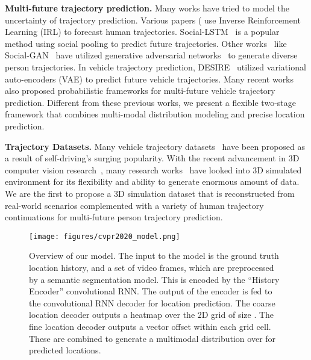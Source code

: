 \documentclass[10pt,twocolumn,letterpaper]{article}
\begin{document}
\noindent\textbf{Multi-future trajectory prediction.}
Many works have tried to model the uncertainty of trajectory prediction.
Various papers (\eg \cite{kitani2012activity,rhinehart2018r2p2,rhinehart2019precog} use Inverse Reinforcement Learning (IRL) to forecast human trajectories. 
Social-LSTM~\cite{alahi2016social} is a popular method using social pooling to predict future trajectories.
Other works~\cite{sadeghian2018sophie,gupta2018social,li2019way,amirian2019social} like Social-GAN~\cite{gupta2018social} have utilized generative adversarial networks~\cite{goodfellow2014generative} to generate diverse person trajectories.
In vehicle trajectory prediction, DESIRE~\cite{lee2017desire} utilized variational auto-encoders (VAE) to predict future vehicle trajectories.
Many recent works~\cite{thiede2019analyzing,chai2019multipath,tang2019multiple,makansi2019overcoming} also proposed probabilistic frameworks for multi-future vehicle trajectory prediction. 
Different from these previous works, we present a flexible two-stage framework that combines multi-modal distribution modeling and precise location prediction.



\noindent\textbf{Trajectory Datasets.}
Many vehicle trajectory datasets~\cite{caesar2019nuscenes,chang2019argoverse} have been proposed as a result of self-driving's surging popularity. 
With the recent advancement in 3D computer vision research~\cite{zhang2015fast,liang2017event,shah2018airsim,dosovitskiy2017carla,richter2016playing,ros2016synthia,heess2017emergence}, many research works~\cite{qiu2017unrealcv, gaidon2016virtual,de2017procedural,das2018embodied,wu2019revisiting,zhu2017target,sun2019stochastic} have looked into 3D simulated environment for its flexibility and ability to generate enormous amount of data.
We are the first to propose a 3D simulation dataset that is reconstructed from real-world scenarios complemented with a variety of human trajectory continuations for multi-future person trajectory prediction. 
%
 
\begin{figure*}[ht]
	\centering
	    \vspace{-4mm}
\texttt{[image: figures/cvpr2020\_model.png]}
		\vspace{-8mm}
	\caption{Overview of our model.
	The input to the model is 
	the ground truth location history,
	and a set of video frames,
	which are preprocessed by a semantic segmentation model. 
	This is encoded by the ``History Encoder''
	convolutional RNN.
	The output of the encoder is fed
	to the convolutional RNN decoder for  location prediction.
	The coarse location decoder outputs
	a heatmap over the 2D grid of size .
	The fine location decoder
	outputs 
	a vector offset within each grid cell.
	These are combined to generate a multimodal distribution
	over  for predicted locations.
}
	\label{fig:model}
	\vspace{-5mm}
\end{figure*}
\end{document}
